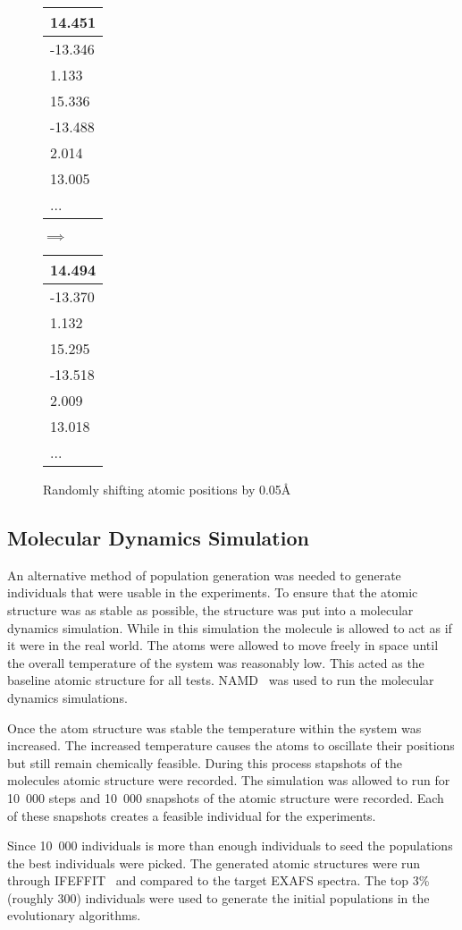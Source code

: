 \begin{figure}
	\centering
	\begin{tabular}{ | l | }
		\hline
		14.451 \\ \hline
		-13.346 \\ \hline
		1.133 \\ \hline
		15.336 \\ \hline
		-13.488 \\ \hline
		2.014 \\ \hline
		13.005 \\ \hline
		... \\ \hline
	\end{tabular}
	\qquad$\implies$\qquad
	\begin{tabular}{ | l | }
		\hline
		14.494 \\ \hline
		-13.370 \\ \hline
		1.132 \\ \hline
		15.295 \\ \hline
		-13.518 \\ \hline
		2.009 \\ \hline
		13.018 \\ \hline
		... \\ \hline
	\end{tabular}
	\caption{Randomly shifting atomic positions by 0.05\AA}
	\label{fig:random-shift}
\end{figure}

\subsection{Molecular Dynamics Simulation}
\label{subsec:molecular-population}

An alternative method of population generation was needed to generate individuals that were usable in the experiments. To ensure that the atomic structure was as stable as possible, the structure was put into a molecular dynamics simulation. While in this simulation the molecule is allowed to act as if it were in the real world. The atoms were allowed to move freely in space until the overall temperature of the system was reasonably low. This acted as the baseline atomic structure for all tests. NAMD~\cite{namd} was used to run the molecular dynamics simulations.

Once the atom structure was stable the temperature within the system was increased. The increased temperature causes the atoms to oscillate their positions but still remain chemically feasible. During this process stapshots of the molecules atomic structure were recorded. The simulation was allowed to run for 10\ 000 steps and 10\ 000 snapshots of the atomic structure were recorded. Each of these snapshots creates a feasible individual for the experiments.

Since 10\ 000 individuals is more than enough individuals to seed the populations the best individuals were picked. The generated atomic structures were run through IFEFFIT~\cite{ifeffit} and compared to the target EXAFS spectra. The top 3\% (roughly 300) individuals were used to generate the initial populations in the evolutionary algorithms.